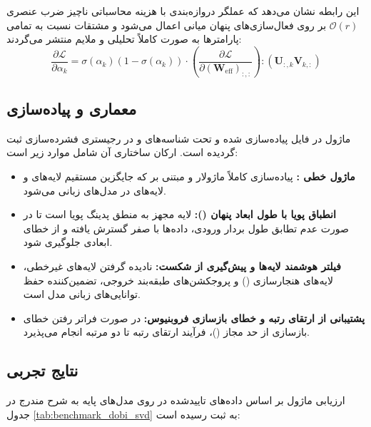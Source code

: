این رابطه نشان می‌دهد که عملگر دروازه‌بندی با هزینه محاسباتی ناچیز ضرب عنصری $\mathcal{O}(r)$ بر روی فعال‌سازی‌های پنهان میانی اعمال می‌شود و مشتقات نسبت به تمامی پارامترها به صورت کاملاً تحلیلی و ملایم منتشر می‌گردند:
\begin{equation}
\frac{\partial \mathcal{L}}{\partial \alpha_k} = \sigma(\alpha_k)(1 - \sigma(\alpha_k)) \cdot \left( \frac{\partial \mathcal{L}}{\partial (\mathbf{W}_{\text{eff}})_{:, :}} \right) : (\mathbf{U}_{:, k} \mathbf{V}_{k, :})
\end{equation}

\subsection{معماری و پیاده‌سازی}
ماژول  در فایل  پیاده‌سازی شده و تحت شناسه‌های  و  در رجیستری فشرده‌سازی ثبت گردیده است. ارکان ساختاری آن شامل موارد زیر است:
\begin{itemize}
    \item \textbf{ماژول خطی :} پیاده‌سازی کاملاً ماژولار و مبتنی بر  که جایگزین مستقیم لایه‌های  و لایه‌های  در مدل‌های زبانی می‌شود.
    \item \textbf{انطباق پویا با طول ابعاد پنهان ():} لایه مجهز به منطق پدینگ پویا است تا در صورت عدم تطابق طول بردار ورودی، داده‌ها با صفر گسترش یافته و از خطای ابعادی جلوگیری شود.
    \item \textbf{فیلتر هوشمند لایه‌ها و پیش‌گیری از شکست:} نادیده گرفتن لایه‌های غیرخطی، لایه‌های هنجارسازی () و پروجکشن‌های طبقه‌بند خروجی، تضمین‌کننده حفظ توانایی‌های زبانی مدل است.
    \item \textbf{پشتیبانی از ارتقای رتبه و خطای بازسازی فروبنیوس:} در صورت فراتر رفتن خطای بازسازی از حد مجاز ()، فرآیند ارتقای رتبه تا دو مرتبه انجام می‌پذیرد.
\end{itemize}

\subsection{نتایج تجربی}
ارزیابی ماژول  بر اساس داده‌های تاییدشده در  روی مدل‌های پایه به شرح مندرج در جدول \ref{tab:benchmark_dobi_svd} به ثبت رسیده است:

